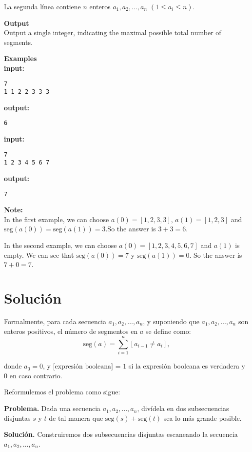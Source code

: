 \documentclass{article}
\begin{document}
La segunda línea contiene $n$ enteros $a_1, a_2, \ldots, a_n$ $(1 \leq a_i \leq n)$.

\large \textbf{Output}\\
Output a single integer, indicating the maximal possible total number of segments.

\large \textbf{Examples}\\
\textbf{input:}
\begin{verbatim}
7
1 1 2 2 3 3 3
\end{verbatim}

\textbf{output:}
\begin{verbatim}
6
\end{verbatim}

\textbf{input:}
\begin{verbatim}
7
1 2 3 4 5 6 7
\end{verbatim}

\textbf{output:}
\begin{verbatim}
7
\end{verbatim}

\textbf{Note:} \\
In the first example, we can choose $a{(0)}=[1,2,3,3]$, $a{(1)}=[1,2,3]$ and $\text{seg}(a{(0)})=\text{seg}(a{(1)})=3$.So the answer is $3+3=6$.

In the second example, we can choose $a{(0)}=[1,2,3,4,5,6,7]$ and $a{(1)}$  is empty. We can see that  $\text{seg}(a{(0)})=7$ y $\text{seg}(a{(1)})=0$. So the answer is $7+0=7$.







\section{Solución}
Formalmente, para cada secuencia $a_1, a_2, \ldots, a_n$, y suponiendo que $a_1, a_2, \ldots, a_n$ son enteros positivos, el número de segmentos en $a$ se define como:
$$
\text{seg}(a) = \sum_{i=1}^{n} [a_{i-1} \neq a_i],
$$

donde $a_0 = 0$, y $[\text{expresión booleana] = 1}$ si la expresión booleana es verdadera y 0 en caso contrario.

Reformulemos el problema como sigue:

\textbf{Problema.} Dada una secuencia $a_1, a_2, \ldots, a_n$, divídela en dos subsecuencias disjuntas $s$ y $t$ de tal manera que $\text{seg}(s) + \text{seg}(t)$ sea lo más grande posible.

\textbf{Solución.} Construiremos dos subsecuencias disjuntas escaneando la secuencia $a_1, a_2, \ldots, a_n$.
\end{document}
